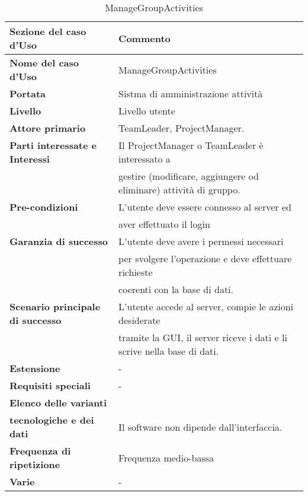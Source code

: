 \documentclass[12pt]{scrartcl}
\begin{document}
\begin{table}[h!]
  \caption{ManageGroupActivities}
  \label{tab:table6}
  \begin{tabular}{|l|l|}
    \toprule
    \textbf{Sezione del caso d'Uso} & \textbf{Commento}\\
    \midrule
    \textbf{Nome del caso d'Uso} & ManageGroupActivities\\
    \midrule
    \textbf{Portata} & Sistma di amministrazione attivit\`a \\
    \midrule
    \textbf{Livello} & Livello utente\\
    \midrule
    \textbf{Attore primario} & TeamLeader, ProjectManager. \\
    \midrule
    \textbf{Parti interessate e Interessi} & Il ProjectManager o TeamLeader \`e interessato a
    \\& gestire (modificare, aggiungere od eliminare) attivit\`a di gruppo.\\
    \midrule
    \textbf{Pre-condizioni} & L'utente deve essere connesso al server ed
    \\& aver effettuato il login\\
    \midrule
    \textbf{Garanzia di successo} & L'utente deve avere i permessi necessari 
    \\& per svolgere l'operazione e deve effettuare richieste
    \\& coerenti con la base di dati.\\
    \midrule
    \textbf{Scenario principale di successo} & L'utente accede al server, compie le azioni desiderate
    \\& tramite la GUI, il server riceve i dati e li scrive nella base di dati.\\
    \midrule
    \textbf{Estensione} & - \\
    \midrule
    \textbf{Requisiti speciali} & - \\
    \midrule
    \textbf{Elenco delle varianti}\\ \textbf{tecnologiche e dei dati} & Il software non dipende dall'interfaccia.\\
    \midrule
    \textbf{Frequenza di ripetizione} & Frequenza medio-bassa\\
    \textbf{Varie} & - \\
    \bottomrule
  \end{tabular}
\end{table}
\end{document}
